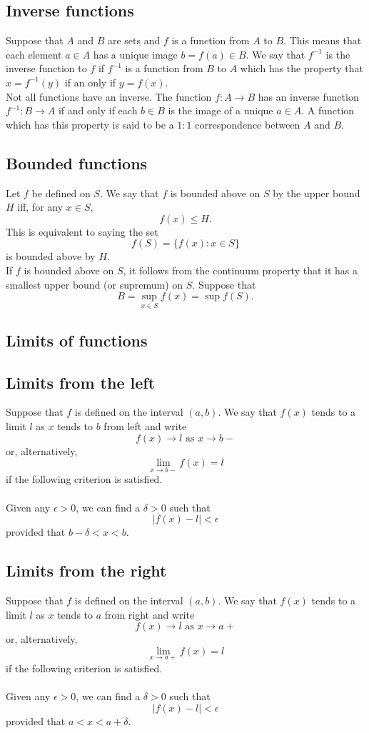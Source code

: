 \documentclass[10pt, a4paper]{article}
\begin{document}
\subsection{Inverse functions}
Suppose that $A$ and $B$ are sets and $f$ is a function from $A$ to $B$. This means that each element $a \in A$ has a unique image $b = f(a) \in B$.
We say that $f ^ {-1}$ is the inverse function to $f$ if $f ^ {-1}$ is a function from $B$ to $A$ which has the property that $x = f ^ {-1}(y)$ if an only if $y = f(x)$.
\\
Not all functions have an inverse. The function $f : A \rightarrow B$ has an inverse function $f ^ {-1}: B \rightarrow A$ if and only if each $b \in B$ is the image of a unique $a \in A$. A function which has this property is said to be a $1:1$ correspondence between $A$ and $B$.

\subsection{Bounded functions}
Let $f$ be defined on $S$. We say that $f$ is bounded above on $S$ by the upper bound $H$ iff, for any $x \in S$,
\[
f(x) \leq H.
\]
This is equivalent to saying the set
\[
f(S) = \{f(x): x \in S\}
\]
is bounded above by $H$.
\\
If $f$ is bounded above on $S$, it follows from the continuum property that it has a smallest upper bound (or supremum) on $S$. Suppose that
\[
B = \sup_{x \in S}f(x) = \sup{f(S)}.
\]

\subsection{Limits of functions}
\subsection{Limits from the left}
Suppose that $f$ is defined on the interval $(a, b)$. We say that $f(x)$ tends to a limit $l$ as $x$ tends to $b$ from left and write
\[f(x) \rightarrow l \text{ as } x \rightarrow b-\]
or, alternatively,
\[\lim_{x \rightarrow b-}{f(x)} = l\]
if the following criterion is satisfied. \\
\\
Given any $\epsilon > 0$, we can find a $\delta > 0$ such that
\[|f(x) - l| < \epsilon\]
provided that $b - \delta < x < b$.

\subsection{Limits from the right}
Suppose that $f$ is defined on the interval $(a, b)$. We say that $f(x)$ tends to a limit $l$ as $x$ tends to $a$ from right and write
\[f(x) \rightarrow l \text{ as } x \rightarrow a+\]
or, alternatively,
\[\lim_{x \rightarrow a+}{f(x)} = l\]
if the following criterion is satisfied. \\
\\
Given any $\epsilon > 0$, we can find a $\delta > 0$ such that
\[|f(x) - l| < \epsilon\]
provided that $a < x < a + \delta$. \\
\\
\end{document}
